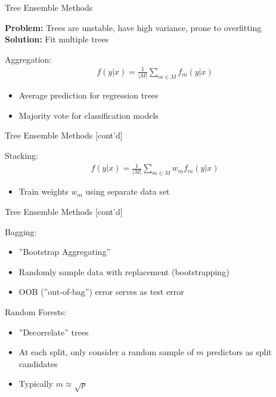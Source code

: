 \documentclass[ignorenonframetext,xcolor=x11names]{beamer}
\begin{document}
\begin{frame}[label=advanced]{Tree Ensemble Methods}

\textbf{Problem:} Trees are unstable, have high variance, prone to overfitting \\

\textbf{Solution:} Fit multiple trees

\begin{block}{Aggregation:}
\begin{align*}
f(y | x) = \frac{1}{|M|} \sum_{m \in M} f_m(y|x)
\end{align*}
\begin{itemize}
   \item Average prediction for regression trees
   \item Majority vote for classification models
\end{itemize}
\end{block}
\end{frame}

\begin{frame}[label=advanced]{Tree Ensemble Methods \small [cont'd]}
\begin{block}{Stacking:}
\begin{align*}
f(y | x) = \frac{1}{|M|} \sum_{m \in M} w_m f_m(y|x)
\end{align*}
\begin{itemize}
   \item Train weights $w_m$ using separate data set
\end{itemize}
\end{block}
\end{frame}

\begin{frame}[label=advanced]{Tree Ensemble Methods \small [cont'd]}
\begin{block}{Bagging:}
\begin{itemize}
  \item ''Bootstrap Aggregating''
  \item Randomly sample data with replacement (bootstrapping)
  \item OOB (''out-of-bag'') error serves as test error
\end{itemize}
\end{block}

\begin{block}{Random Forests:}
\begin{itemize}
  \item ''Decorrelate'' trees
  \item At each split, only consider a random sample of $m$ predictors as split candidates
  \item Typically $m \approx \sqrt{p}$
\end{itemize}
\end{block}
\end{frame}
\end{document}
